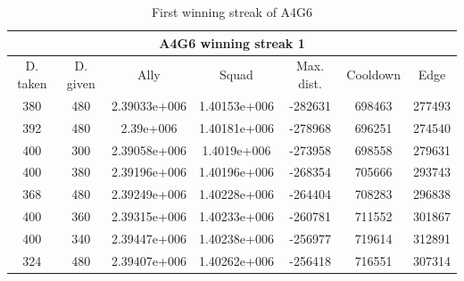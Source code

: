 \begin{table}

 \begin{tabular}{|c||c|c|c|c|c|c|}
	\multicolumn{7}{c}{A4G6 winning streak 1} \\
	\hline
	D. taken &			 D. given &		 Ally &		 Squad &		 Max. dist. &		 Cooldown & 		Edge \\
	\hline
	380& 				 		480&						2.39033e+006&1.40153e+006&-282631&			698463&			277493\\
	392& 						480& 					2.39e+006&		1.40181e+006&-278968&			696251&			274540\\
	400& 						300& 					2.39058e+006&1.4019e+006&	-273958&			698558&			279631\\
	400& 						380& 					2.39196e+006&1.40196e+006&-268354&			705666&			293743\\
	368& 						480& 					2.39249e+006&1.40228e+006&-264404&			708283&			296838\\
	400& 						360& 					2.39315e+006&1.40233e+006&-260781&			711552&			301867\\
	400& 						340& 					2.39447e+006&1.40238e+006&-256977&			719614&			312891\\
	324& 						480&						2.39407e+006&1.40262e+006&-256418&			716551&			307314\\
	\hline

\end{tabular}
	\label{winning_streak_A4G6_1.1}
	\caption{First winning streak of A4G6}
\end{table}




